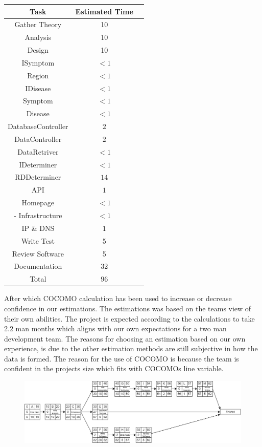\begin{center}
	\begin{tabular}[h]{|c|c|c|}
		\hline
		Task & Estimated Time \\ \hline
		Gather Theory & 10 \\ \hline
		Analysis & 10 \\ \hline
		Design & 10 \\ \hline
		ISymptom & $<1$ \\ \hline
		Region & $<1$ \\ \hline
		IDisease & $<1$ \\ \hline
		Symptom & $<1$  \\ \hline
		Disease & $<1$ \\ \hline
		DatabaseController & $2$ \\ \hline
		DataController & $2$  \\ \hline
		DataRetriver & $<1$ \\ \hline
		IDeterminer & $<1$ \\ \hline
		RDDeterminer & $14$ \\ \hline
		API & $1$ \\ \hline
		Homepage & $<1$ \\ \hline-
		Infrastructure & $<1$ \\ \hline
		IP \& DNS & $1$  \\ \hline
		Write Test & 5 \\ \hline
		Review Software & 5 \\ \hline
		Documentation & 32\\ \hline
		Total & $ 96 $ \\ \hline
	\end{tabular}
\end{center}

After which COCOMO calculation\cite{NasaCOCOMOCalculation} has been used to increase or decrease confidence in our estimations. The estimations was based on the teams view of their own abilities. The project is expected according to the calculations to take 2.2 man months which aligns with our own expectations for a two man development team. The reasons for choosing an estimation based on our own experience, is due to the other estimation methods are still subjective in how the data is formed. The reason for the use of COCOMO is because the team is confident in the projects size which fits with COCOMOs line variable.

\pagebreak
\begin{center}
	\begin{figure}
		\includegraphics[width=42em,keepaspectratio]{Network Diagram.png}
	\end{figure}
\end{center}


